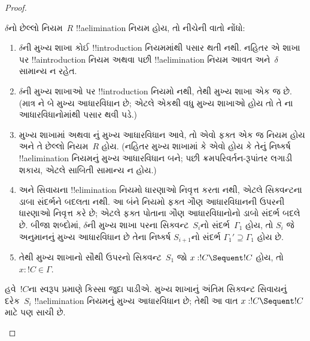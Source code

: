 \documentclass[../../../include/open-logic-section]{subfiles}
\begin{document}
\begin{proof}
\begin{enumerate}
  $\delta$નો
  છેલ્લો નિયમ~$R$
  !!a{elimination}
  નિયમ હોય,
  તો નીચેની
  વાતો નોંધો:
  \begin{enumerate}
    \item $\delta$ની
    મુખ્ય શાખા
    કોઈ !!{introduction}
    નિયમમાંથી
    પસાર થતી
    નથી. નહિતર
    એ શાખા પર
    !!a{introduction}
    નિયમ અથવા
    \FalseInt{}
    પછી
    !!a{elimination}
    નિયમ આવત
    અને~$\delta$
    સામાન્ય ન
    રહેત.
    \item $\delta$ની
    મુખ્ય શાખાઓ
    પર !!{introduction}
    નિયમો નથી,
    તેથી મુખ્ય
    શાખા એક
    જ છે.
    (માત્ર
    \Intro{\land}ને
    બે મુખ્ય
    આધારવિધાન છે;
    એટલે એકથી
    વધુ મુખ્ય
    શાખાઓ હોય
    તો તે
    \Intro{\land}ના
    આધારવિધાનોમાંથી
    પસાર થવી
    પડે.)
    \item મુખ્ય
    શાખામાં
    \Elim{\lor}
    અથવા
    \Elim{\lexists}નું
    મુખ્ય આધારવિધાન
    આવે, તો
    એવો ફક્ત
    એક જ
    નિયમ હોય
    અને તે
    છેલ્લો
    નિયમ~$R$
    હોય.
    (નહિતર
    મુખ્ય શાખામાં
    \Elim{\lor}
    કે
    \Elim{\lexists}
    એવો હોય
    કે તેનું
    નિષ્કર્ષ
    !!a{elimination}
    નિયમનું મુખ્ય
    આધારવિધાન
    બને; પછી
    ક્રમપરિવર્તન-રૂપાંતર
    લગાડી શકાય,
    એટલે સાબિતી
    સામાન્ય ન
    હોય.)
  \item \Elim{\lor}
  અને
  \Elim{\lexists}
  સિવાયના
  !!{elimination}
  નિયમો ધારણાઓ
  નિવૃત્ત કરતા
  નથી, એટલે
  સિક્વન્ટના
  ડાબા સંદર્ભને
  બદલતા નથી.
  આ બંને નિયમો
  ફક્ત ગૌણ
  આધારવિધાનની
  ઉપરની ધારણાઓ
  નિવૃત્ત કરે
  છે; એટલે
  ફક્ત પોતાના
  ગૌણ આધારવિધાનોનો
  ડાબો સંદર્ભ
  બદલે છે.
  બીજા શબ્દોમાં,
  $\delta$ની
  મુખ્ય શાખા
  પરના
  સિક્વન્ટ~$S_i$નો
  સંદર્ભ~$\Gamma_1$
  હોય, તો
  $S_i$ જે
  અનુમાનનું
  મુખ્ય આધારવિધાન
  છે તેના
  નિષ્કર્ષ
  $S_{i+1}$નો
  સંદર્ભ
  $\Gamma_1' \supseteq \Gamma_1$
  હોય છે.
  \item તેથી
  મુખ્ય શાખાનો
  સૌથી ઉપરનો
  સિક્વન્ટ~$S_1$
  જો
  $x: !C \Sequent !C$
  હોય, તો
  $x:!C \in \Gamma$.
  \end{enumerate}
  હવે~$!C$ના
  સ્વરૂપ પ્રમાણે
  કિસ્સા જુદા
  પાડીએ. મુખ્ય
  શાખાનું અંતિમ
  સિક્વન્ટ સિવાયનું
  દરેક~$S_i$
  !!a{elimination}
  નિયમનું મુખ્ય
  આધારવિધાન છે;
  તેથી આ વાત
  $x:!C \Sequent !C$
  માટે પણ
  સાચી છે.
  


\end{enumerate}
\end{proof}
\end{document}
